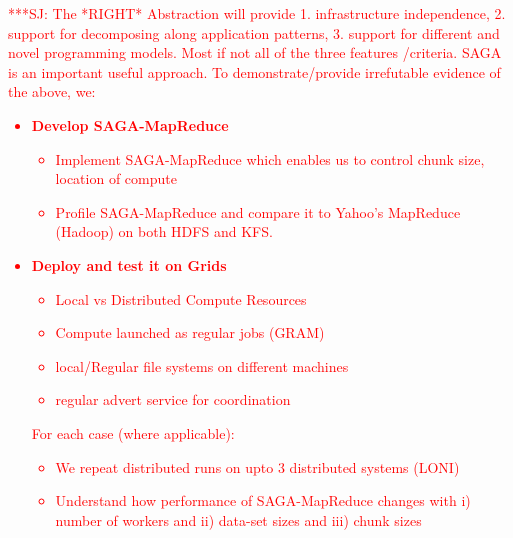 \documentclass[conference,final]{IEEEtran}
\newcommand{\jhanote}[1]{ {\textcolor{red} { ***SJ: #1 }}}
\newcommand{\jhanote}[1]{}
\begin{document}


\jhanote{The *RIGHT* Abstraction will provide 1. infrastructure
  independence, 2. support for decomposing along application patterns,
  3. support for different and novel programming models. Most if not
  all of the three features /criteria. SAGA is an important useful
  approach.  To demonstrate/provide irrefutable evidence of the above,
  we:

\begin{itemize}
\item {\bf Develop SAGA-MapReduce }

  \begin{itemize}
  \item Implement SAGA-MapReduce which enables us to control chunk
    size, location of compute
  \item Profile SAGA-MapReduce and compare it to Yahoo's MapReduce
    (Hadoop) on both HDFS and KFS.
  \end{itemize}

\item {\bf Deploy and test it on Grids}
  \begin{itemize}
  \item Local vs Distributed Compute Resources
  \item Compute launched as regular jobs (GRAM)
  \item local/Regular file systems on different machines
  \item regular advert service for coordination
  \end{itemize}

For each case (where applicable):
  \begin{itemize}
  \item We repeat distributed runs on upto 3 distributed systems
    (LONI)
  \item Understand how performance of SAGA-MapReduce changes with i)
    number of workers and ii) data-set sizes and iii) chunk sizes
  \end{itemize}


\end{itemize}}
\end{document}
